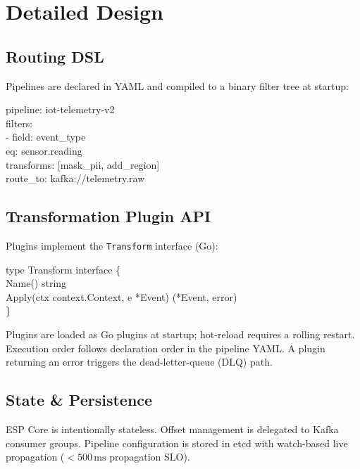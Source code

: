 \section{Detailed Design}

\subsection{Routing DSL}

Pipelines are declared in YAML and compiled to a binary filter tree at startup:

\begin{tcolorbox}[
  enhanced, sharp corners,
  colback=gray!5, colframe=rule, boxrule=0.5pt,
  fontupper=\small\ttfamily,
  left=6pt, right=6pt, top=4pt, bottom=4pt,
  before skip=4pt, after skip=4pt
]
pipeline: iot-telemetry-v2\\
\phantom{xx}filters:\\
\phantom{xxxx}- field: event\_type\\
\phantom{xxxxxxxx}eq: sensor.reading\\
\phantom{xxxx}transforms: [mask\_pii, add\_region]\\
\phantom{xxxx}route\_to: kafka://telemetry.raw
\end{tcolorbox}

\subsection{Transformation Plugin API}

Plugins implement the \texttt{Transform} interface (Go):

\begin{tcolorbox}[
  enhanced, sharp corners,
  colback=gray!5, colframe=rule, boxrule=0.5pt,
  fontupper=\small\ttfamily,
  left=6pt, right=6pt, top=4pt, bottom=4pt,
  before skip=4pt, after skip=4pt
]
type Transform interface \{\\
\phantom{xxxx}Name() string\\
\phantom{xxxx}Apply(ctx context.Context, e *Event) (*Event, error)\\
\}
\end{tcolorbox}

Plugins are loaded as Go plugins at startup; hot-reload requires a rolling
restart. Execution order follows declaration order in the pipeline YAML.
A plugin returning an error triggers the dead-letter-queue (DLQ) path.

\subsection{State \& Persistence}

ESP Core is intentionally stateless. Offset management is delegated to Kafka
consumer groups. Pipeline configuration is stored in etcd with watch-based
live propagation ($<\!500\,\mathrm{ms}$ propagation SLO).

